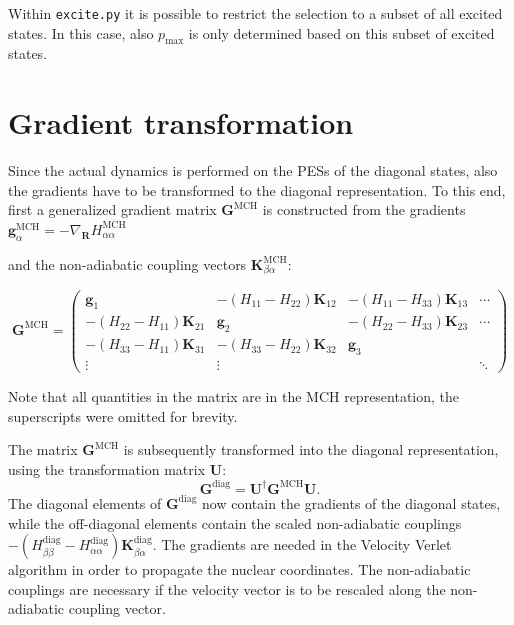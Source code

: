 \documentclass[a4paper,11pt,DIV=15,openany,twoside=false]{scrbook}
\newcommand{\tthdump}[1]{#1}
\newcommand{\ttt}[1]{\texttt{#1}}
\renewcommand{\vec}[1]{\ensuremath{\mathbf{#1}}}
\begin{document}
Within \ttt{excite.py} it is possible to restrict the selection to a subset of all excited states. In this case, also $p_{\text{max}}$ is only determined based on this subset of excited states.


\section{Gradient transformation}\label{met:gradtra}

Since the actual dynamics is performed on the PESs of the diagonal states, also the gradients have to be transformed to the diagonal representation. To this end, first a generalized gradient matrix $\vec{G}^{\text{MCH}}$ is constructed from the gradients %
\tthdump{%
$\vec{g}^{\text{MCH}}_\alpha=-\nabla_\vec{R}H_{\alpha\alpha}^{\text{MCH}}$%
}
and the non-adiabatic coupling vectors 
$\vec{K}_{\beta\alpha}^{\text{MCH}}$:
\tthdump{
  \begin{equation}
    \vec{G}^{\text{MCH}}=
    \begin{pmatrix}
      \vec{g}_1   &-(H_{11}-H_{22})\vec{K}_{12} &-(H_{11}-H_{33})\vec{K}_{13} &\cdots\\
      -(H_{22}-H_{11})\vec{K}_{21}      &\vec{g}_2      &-(H_{22}-H_{33})\vec{K}_{23}&\cdots\\
      -(H_{33}-H_{11})\vec{K}_{31}      &-(H_{33}-H_{22})\vec{K}_{32} &\vec{g}_3\\
      \vdots      &\vdots         &       &\ddots
    \end{pmatrix}
  \end{equation}
}
Note that all quantities in the matrix are in the MCH representation, the superscripts were omitted for brevity.

The matrix $\vec{G}^{\text{MCH}}$ is subsequently transformed into the diagonal representation, using the transformation matrix $\vec{U}$:
\begin{equation}
  \vec{G}^{\text{diag}}=\vec{U}^\dagger\vec{G}^{\text{MCH}}\vec{U}.
\end{equation}
The diagonal elements of $\vec{G}^{\text{diag}}$ now contain the gradients of the diagonal states, while the off-diagonal elements contain the scaled non-adiabatic couplings $-(H^{\text{diag}}_{\beta\beta}-H^{\text{diag}}_{\alpha\alpha})\vec{K}_{\beta\alpha}^{\text{diag}}$. The gradients are needed in the Velocity Verlet algorithm in order to propagate the nuclear coordinates. The non-adiabatic couplings are necessary if the velocity vector is to be rescaled along the non-adiabatic coupling vector.
\end{document}
